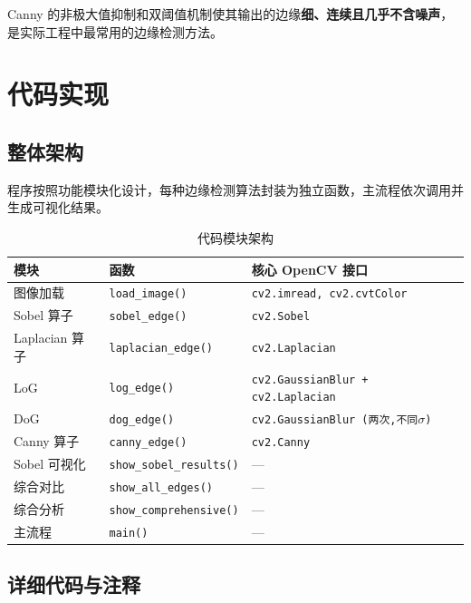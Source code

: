 \documentclass[12pt,a4paper]{ctexart}
\begin{document}
Canny 的非极大值抑制和双阈值机制使其输出的边缘\textbf{细、连续且几乎不含噪声}，是实际工程中最常用的边缘检测方法。

\newpage

\section{代码实现}

\subsection{整体架构}

程序按照功能模块化设计，每种边缘检测算法封装为独立函数，主流程依次调用并生成可视化结果。

\begin{table}[H]
    \centering
    \caption{代码模块架构}
    \begin{tabular}{lll}
        \toprule
        \textbf{模块} & \textbf{函数} & \textbf{核心 OpenCV 接口} \\
        \midrule
        图像加载 & \texttt{load\_image()} & \texttt{cv2.imread, cv2.cvtColor} \\
        Sobel 算子 & \texttt{sobel\_edge()} & \texttt{cv2.Sobel} \\
        Laplacian 算子 & \texttt{laplacian\_edge()} & \texttt{cv2.Laplacian} \\
        LoG & \texttt{log\_edge()} & \texttt{cv2.GaussianBlur + cv2.Laplacian} \\
        DoG & \texttt{dog\_edge()} & \texttt{cv2.GaussianBlur (两次,不同$\sigma$)} \\
        Canny 算子 & \texttt{canny\_edge()} & \texttt{cv2.Canny} \\
        Sobel 可视化 & \texttt{show\_sobel\_results()} & --- \\
        综合对比 & \texttt{show\_all\_edges()} & --- \\
        综合分析 & \texttt{show\_comprehensive()} & --- \\
        主流程 & \texttt{main()} & --- \\
        \bottomrule
    \end{tabular}
\end{table}

\subsection{详细代码与注释}
\end{document}
